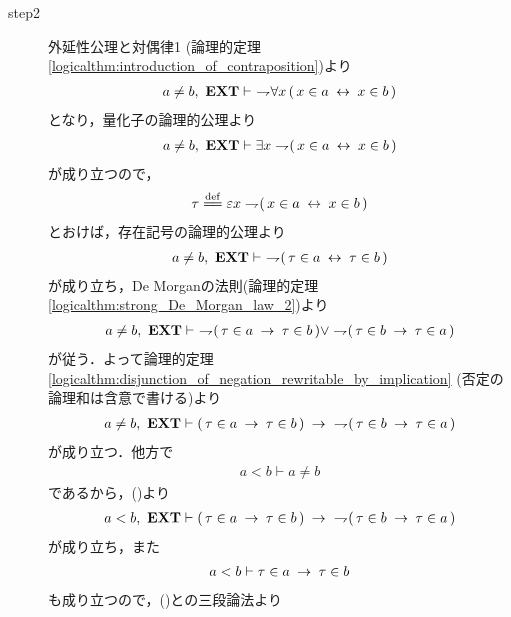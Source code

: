 \begin{prf}
\begin{description}
			\item[step2]
				外延性公理と対偶律1 
				(論理的定理\ref{logicalthm:introduction_of_contraposition})より
				\begin{align}
					a \neq b,\ \mbox{{\bf EXT}} \vdash\ \rightharpoondown\hspace{-0.25em}\forall x\, (\, x \in a \hspace{0.25em}\leftrightarrow\hspace{0.25em} x \in b\, )
				\end{align}
				となり，量化子の論理的公理より
				\begin{align}
					a \neq b,\ \mbox{{\bf EXT}} \vdash \exists x \rightharpoondown\hspace{-0.25em} (\, x \in a \hspace{0.25em}\leftrightarrow\hspace{0.25em} x \in b\, )
				\end{align}
				が成り立つので，
				\begin{align}
					\tau \defeq \varepsilon x \negation (\, x \in a \lrarrow x \in b\, )
				\end{align}
				とおけば，存在記号の論理的公理より
				\begin{align}
					a \neq b,\ \mbox{{\bf EXT}} \vdash\ \rightharpoondown\hspace{-0.25em} (\, \tau \in a \hspace{0.25em}\leftrightarrow\hspace{0.25em} \tau \in b\, )
				\end{align}
				が成り立ち，De Morganの法則(論理的定理\ref{logicalthm:strong_De_Morgan_law_2})より
				\begin{align}
					a \neq b,\ \mbox{{\bf EXT}} \vdash\ \rightharpoondown\hspace{-0.25em} (\, \tau \in a \hspace{0.25em}\rightarrow\hspace{0.25em} \tau \in b\, ) \vee
					\rightharpoondown\hspace{-0.25em} (\, \tau \in b \hspace{0.25em}\rightarrow\hspace{0.25em} \tau \in a\, )
				\end{align}
				が従う．よって論理的定理\ref{logicalthm:disjunction_of_negation_rewritable_by_implication}
				(否定の論理和は含意で書ける)より
				\begin{align}
					a \neq b,\ \mbox{{\bf EXT}} \vdash (\, \tau \in a \hspace{0.25em}\rightarrow\hspace{0.25em} \tau \in b\, )
					\hspace{0.25em}\rightarrow\hspace{0.25em}\ \rightharpoondown\hspace{-0.25em} (\, \tau \in b \hspace{0.25em}\rightarrow\hspace{0.25em} \tau \in a\, )
					\label{fom:element_and_proper_subset_correspond_22}
				\end{align}
				が成り立つ．他方で
				\begin{align}
					a < b \vdash a \neq b
				\end{align}
				であるから，()より
				\begin{align}
					a < b,\ \mbox{{\bf EXT}} \vdash (\, \tau \in a \hspace{0.25em}\rightarrow\hspace{0.25em} \tau \in b\, )
					\hspace{0.25em}\rightarrow\hspace{0.25em}\ \rightharpoondown\hspace{-0.25em} (\, \tau \in b \hspace{0.25em}\rightarrow\hspace{0.25em} \tau \in a\, )
					\label{fom:element_and_proper_subset_correspond_6}
				\end{align}
				が成り立ち，また
				\begin{align}
					a < b \vdash \tau \in a \hspace{0.25em}\rightarrow\hspace{0.25em} \tau \in b
				\end{align}
				も成り立つので，()との三段論法より

\end{description}
\end{prf}
